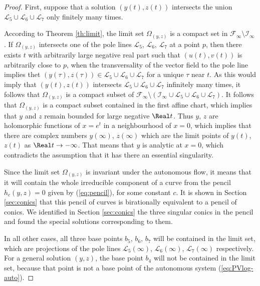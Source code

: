 \begin{proof}
First, suppose that a solution $(y(t),z(t))$ intersects the union $\mathcal{L}_5\cup\mathcal{L}_6\cup\mathcal{L}_7$ only finitely many times.

According to Theorem \ref{th:limit}, the limit set $\Omega_{(y,z)}$ is a compact set in $\mathcal{F}_{\infty}\setminus\mathcal{I}_{\infty}$.
If $\Omega_{(y,z)}$ intersects one of the pole lines $\mathcal{L}_5$, $\mathcal{L}_6$, $\mathcal{L}_7$ at a point $p$, then there exists $t$ with arbitrarily large negative real part such that $(u(t),v(t))$ is arbitrarily close to $p$, when the transversality of the vector field to the pole line implies thet $(y(\tau),z(\tau))\in\mathcal{L}_5\cup\mathcal{L}_6\cup\mathcal{L}_7$ for a unique $\tau$ near $t$.
As this would imply that $(y(t),z(t))$ intersects $\mathcal{L}_5\cup\mathcal{L}_6\cup\mathcal{L}_7$ infinitely many times, it follows that $\Omega_{(y,z)}$ is a compact subset of $\mathcal{F}_{\infty}\setminus(\mathcal{I}_{\infty}\cup\mathcal{L}_5\cup\mathcal{L}_6\cup\mathcal{L}_7)$.
It follows that $\Omega_{(y,z)}$ is a compact subset contained in the first affine chart, which implies that $y$ and $z$ remain bounded for large negative $\Real t$.
Thus $y$, $z$ are holomorphic functions of $x=e^t$ in a neighbourhood of $x=0$, which implies that there are complex numbers $y(\infty)$, $z(\infty)$ which are the limit points of $y(t)$, $z(t)$ as $\Real t\to-\infty$.
That means that $y$ is analytic at $x=0$, which contradicts the assumption that it has there an essential singularity.

Since the limit set $\Omega_{(y,z)}$ is invariant under the autonomous flow, it means that it will contain the whole irreducible component of a curve from the pencil $h_c(y,z)=0$ given by (\ref{eq:pencil}), for some constant $c$.
It is shown in Section \ref{sec:conics} that this pencil of curves is birationally equivalent to a pencil of conics.
We identified in Section \ref{sec:conics} the three singular conics in the pencil and found the special solutions corresponding to them.

In all other cases, all three base points $b_5$, $b_6$, $b_7$ will be contained in the limit set, which are projections of the pole lines $\mathcal{L}_5(\infty)$, $\mathcal{L}_6(\infty)$, $\mathcal{L}_7(\infty)$ respectively.
For a general solution $(y,z)$, the base point $b_4$ will not be contained in the limit set, because that point is not a base point of the autonomous system (\ref{eq:PVlog-auto}).
\end{proof}

